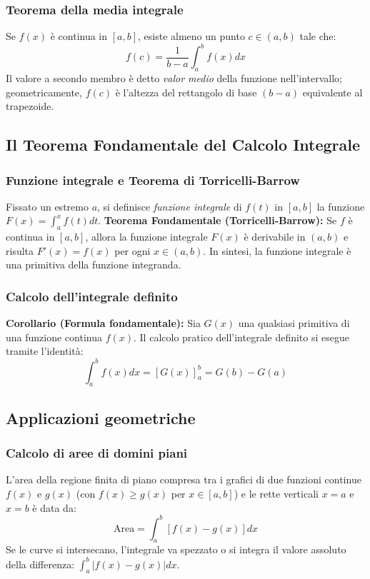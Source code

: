 \subsubsection{Teorema della media integrale}
Se $f(x)$ è continua in $[a,b]$, esiste almeno un punto $c \in (a,b)$ tale che:
\[ f(c) = \frac{1}{b-a} \int_a^b f(x) dx \]
Il valore a secondo membro è detto \textit{valor medio} della funzione nell'intervallo; geometricamente, $f(c)$ è l'altezza del rettangolo di base $(b-a)$ equivalente al trapezoide.

\subsection{Il Teorema Fondamentale del Calcolo Integrale}
\subsubsection{Funzione integrale e Teorema di Torricelli-Barrow}
Fissato un estremo $a$, si definisce \textit{funzione integrale} di $f(t)$ in $[a,b]$ la funzione $F(x) = \int_a^x f(t) dt$.
\textbf{Teorema Fondamentale (Torricelli-Barrow):} Se $f$ è continua in $[a,b]$, allora la funzione integrale $F(x)$ è derivabile in $(a,b)$ e risulta $F'(x) = f(x)$ per ogni $x \in (a,b)$. In sintesi, la funzione integrale è una primitiva della funzione integranda.

\subsubsection{Calcolo dell'integrale definito}
\textbf{Corollario (Formula fondamentale):} Sia $G(x)$ una qualsiasi primitiva di una funzione continua $f(x)$. Il calcolo pratico dell'integrale definito si esegue tramite l'identità:
\[ \int_a^b f(x) dx = \left[ G(x) \right]_a^b = G(b) - G(a) \]

\subsection{Applicazioni geometriche}
\subsubsection{Calcolo di aree di domini piani}
L'area della regione finita di piano compresa tra i grafici di due funzioni continue $f(x)$ e $g(x)$ (con $f(x) \ge g(x)$ per $x \in [a,b]$) e le rette verticali $x=a$ e $x=b$ è data da:
\[ \text{Area} = \int_a^b [f(x) - g(x)] dx \]
Se le curve si intersecano, l'integrale va spezzato o si integra il valore assoluto della differenza: $\int_a^b |f(x)-g(x)|dx$.


